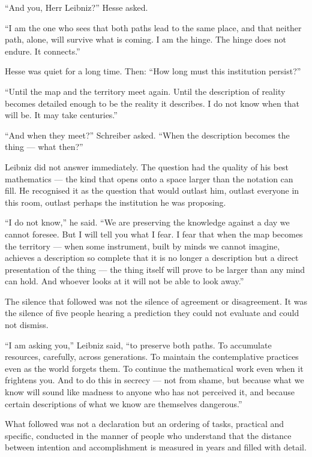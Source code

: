 ``And you, Herr Leibniz?'' Hesse asked.

``I am the one who sees that both paths lead to the same place, and that neither path, alone, will survive what is coming. I am the hinge. The hinge does not endure. It connects.''

Hesse was quiet for a long time. Then: ``How long must this institution persist?''

``Until the map and the territory meet again. Until the description of reality becomes detailed enough to be the reality it describes. I do not know when that will be. It may take centuries.''

``And when they meet?'' Schreiber asked. ``When the description becomes the thing --- what then?''

Leibniz did not answer immediately. The question had the quality of his best mathematics --- the kind that opens onto a space larger than the notation can fill. He recognised it as the question that would outlast him, outlast everyone in this room, outlast perhaps the institution he was proposing.

``I do not know,'' he said. ``We are preserving the knowledge against a day we cannot foresee. But I will tell you what I fear. I fear that when the map becomes the territory --- when some instrument, built by minds we cannot imagine, achieves a description so complete that it is no longer a description but a direct presentation of the thing --- the thing itself will prove to be larger than any mind can hold. And whoever looks at it will not be able to look away.''

The silence that followed was not the silence of agreement or disagreement. It was the silence of five people hearing a prediction they could not evaluate and could not dismiss.

``I am asking you,'' Leibniz said, ``to preserve both paths. To accumulate resources, carefully, across generations. To maintain the contemplative practices even as the world forgets them. To continue the mathematical work even when it frightens you. And to do this in secrecy --- not from shame, but because what we know will sound like madness to anyone who has not perceived it, and because certain descriptions of what we know are themselves dangerous.''

\scenebreak

What followed was not a declaration but an ordering of tasks, practical and specific, conducted in the manner of people who understand that the distance between intention and accomplishment is measured in years and filled with detail.

